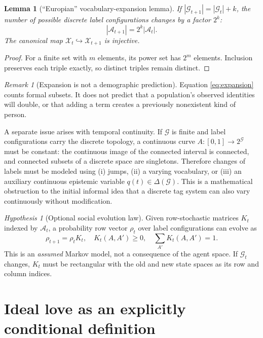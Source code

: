 \documentclass[11pt,a4paper]{article}
\numberwithin{equation}{section}
\newtheorem{lemma}[definition]{Lemma}
\theoremstyle{remark}
\newtheorem{remark}[definition]{Remark}
\newtheorem{hypothesis}[definition]{Hypothesis}
\newcommand{\G}{\mathcal{G}}
\newcommand{\A}{\mathcal{A}}
\newcommand{\X}{\mathcal{X}}
\newcommand{\1}{\mathbf{1}}
\begin{document}
\begin{lemma}[``Europian'' vocabulary-expansion lemma]\label{lem:expansion}
If $|\G_{t+1}|=|\G_t|+k$, the number of possible discrete
label configurations changes by a factor $2^k$:
\begin{equation}\label{eq:expansion}
|\A_{t+1}|=2^k|\A_t|.
\end{equation}
The canonical map $\X_t\hookrightarrow\X_{t+1}$ is injective.
\end{lemma}
\begin{proof}
For a finite set with $m$ elements, its power set has $2^m$
elements.  Inclusion preserves each triple exactly, so distinct
triples remain distinct.
\end{proof}

\begin{remark}[Expansion is not a demographic prediction]
Equation \eqref{eq:expansion} counts formal subsets.  It does not
predict that a population's observed identities will double, or that
adding a term creates a previously nonexistent kind of person.
\end{remark}

A separate issue arises with temporal continuity.  If $\G$ is
finite and label configurations carry the discrete topology, a
continuous curve $A:[0,1]\to2^{\G}$ must be constant: the continuous
image of the connected interval is connected, and connected subsets
of a discrete space are singletons.  Therefore changes of labels
must be modeled using (i) jumps, (ii) a varying vocabulary, or
(iii) an auxiliary continuous epistemic variable $q(t)\in\Delta(\G)$.
This is a mathematical obstruction to the initial informal idea that
a discrete tag system can also vary continuously without modification.

\begin{hypothesis}[Optional social evolution law]
Given row-stochastic matrices $K_t$ indexed by $\A_t$, a probability
row vector $\rho_t$ over label configurations can evolve as
\begin{equation}\label{eq:markov}
\rho_{t+1}=\rho_tK_t,
\quad K_t(A,A')\ge0,
\quad\sum_{A'}K_t(A,A')=1.
\end{equation}
This is an \emph{assumed} Markov model, not a consequence of the agent
space.  If $\G_t$ changes, $K_t$ must be rectangular with the old
and new state spaces as its row and column indices.
\end{hypothesis}

\section{Ideal love as an explicitly conditional definition}
\end{document}
